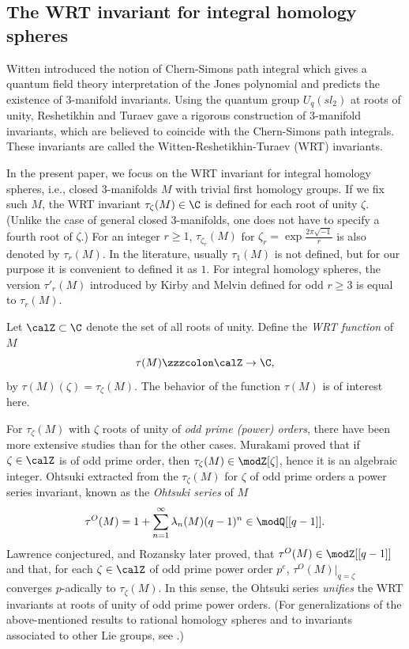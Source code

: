 \documentclass{amsart}
\numberwithin{equation}{section}
\numberwithin{figure}{section}
\theoremstyle{plain}
\theoremstyle{definition}
\theoremstyle{remark}
\begin{document}
\subsection{The WRT invariant for integral homology spheres}
\label{sec:witt-resh-tura-1}

Witten \cite{Witten} introduced the notion of Chern-Simons path
integral which gives a quantum field theory interpretation of the
Jones polynomial \cite{Jones1,Jones2} and predicts the existence of
$3$-manifold invariants.  Using the quantum group $U_q(sl_2)$ at roots
of unity, Reshetikhin and Turaev \cite{Reshetikhin-Turaev:invariants}
gave a rigorous construction of $3$-manifold invariants, which are
believed to coincide with the Chern-Simons path integrals.  These
invariants are called the Witten-Reshetikhin-Turaev (WRT) invariants.

In the present paper, we focus on the WRT invariant for integral
homology spheres, i.e., closed $3$-manifolds $M$ with trivial first
homology groups.  If we fix such $M$, the WRT invariant $\tau _\zeta (M)\in \C$
is defined for each root of unity $\zeta $.  (Unlike the case of general
closed $3$-manifolds, one does not have to specify a fourth root of
$\zeta $.)  For an integer $r\ge 1$, $\tau _{\zeta _r}(M)$ for
$\zeta _r=\exp\frac{2\pi \sqrt{-1}}{r}$ is also denoted by $\tau _r(M)$.  In
the literature, usually $\tau _1(M)$ is not defined, but for our purpose
it is convenient to defined it as $1$.  For integral homology spheres,
the version $\tau '_r(M)$ introduced by Kirby and Melvin
\cite{Kirby-Melvin} defined for odd $r\ge 3$ is equal to $\tau _r(M)$.

Let $\calZ\subset \C$ denote the set
of all roots of unity.  Define the {\em WRT function} of $M$
\begin{equation*}
  \tau (M)\zzzcolon \calZ\rightarrow \C,
\end{equation*}
by $\tau (M)(\zeta )=\tau _\zeta (M)$.  The behavior of the function $\tau (M)$ is of
interest here.

For $\tau _\zeta (M)$ with $\zeta $ roots of unity of {\em odd prime (power)
orders}, there have been more extensive studies than for the other
cases.  Murakami \cite{Murakami1} proved that if $\zeta \in \calZ$ is of odd
prime order, then $\tau _\zeta (M)\in \modZ [\zeta ]$, hence it is an algebraic
integer.  Ohtsuki \cite{Ohtsuki1} extracted from the $\tau _\zeta (M)$ for
$\zeta $ of odd prime orders a power series invariant, known as the {\em
Ohtsuki series} of $M$
\begin{equation*}
  \tau ^O(M)=1+\sum_{n=1}^\infty \lambda _n(M)(q-1)^n\in \modQ [[q-1]].
\end{equation*}
Lawrence \cite{Lawrence:integrality} conjectured, and Rozansky
\cite{Rozansky} later proved, that $\tau ^O(M)\in \modZ [[q-1]]$ and that, for
each $\zeta \in \calZ$ of odd prime power order $p^e$, $\tau ^O(M)|_{q=\zeta }$
converges $p$-adically to $\tau _\zeta (M)$.  In this sense, the Ohtsuki
series {\em unifies} the WRT invariants at roots of unity of odd prime
power orders.  (For generalizations of the above-mentioned results to
rational homology spheres and to invariants associated to other Lie
groups, see
\cite{Le1,Le2,Masbaum-Roberts,Masbaum-Wenzl,Murakami2,Ohtsuki2,Takata-Yokota}.)
\end{document}
